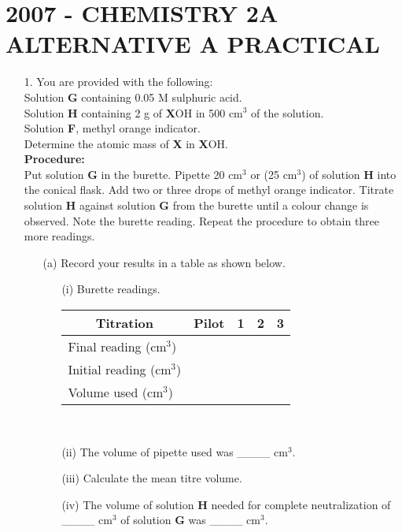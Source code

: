 \section{2007 - CHEMISTRY 2A ALTERNATIVE A PRACTICAL}

\begin{enumerate}
\item[1.] You are provided with the following:\\

Solution \textbf{G} containing 0.05 M sulphuric acid.\\
Solution \textbf{H} containing 2 g of \textbf{X}OH in 500 cm$^3$ of the solution.\\
Solution \textbf{F}, methyl orange indicator.\\

Determine the atomic mass of \textbf{X} in \textbf{X}OH.\\

\textbf{Procedure:}\\

Put solution \textbf{G} in the burette. Pipette 20 cm$^3$ or (25 cm$^3$) of solution \textbf{H} into the conical flask. Add two or three drops of methyl orange indicator. Titrate solution \textbf{H} against solution \textbf{G} from the burette until a colour change is observed. Note the burette reading. Repeat the procedure to obtain three more readings.
\begin{enumerate}
\item[(a)] Record your results in a table as shown below.\\
\begin{enumerate}
\item[(i)] Burette readings.\\

\begin{center}
\begin{tabular}{|l|p{2cm}|p{2cm}|p{2cm}|p{2cm}|} \hline
\multicolumn{1}{|c|}{\textbf{Titration}}&\textbf{Pilot}&\textbf{1}&\textbf{2}&\textbf{3}\\ \hline
Final reading (cm$^3$)&&&&\\ \hline
Initial reading (cm$^3$)&&&&\\ \hline
Volume used (cm$^3$)&&&&\\ \hline
\end{tabular}\\

\end{center}

\item[(ii)] The volume of pipette used was \_\_\_\_ cm$^3$.
\item[(iii)] Calculate the mean titre volume.
\item[(iv)] The volume of solution \textbf{H} needed for complete neutralization of \_\_\_\_ cm$^3$ of solution \textbf{G} was \_\_\_\_ cm$^3$.\\


\end{enumerate}
\end{enumerate}
\end{enumerate}
